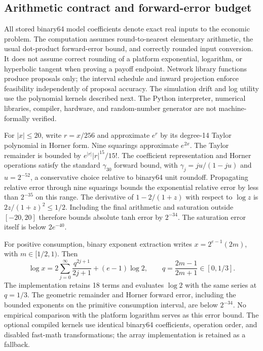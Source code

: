 \subsection{Arithmetic contract and forward-error budget}\label{app:r11arithmetic}
All stored binary64 model coefficients denote exact real inputs to the economic problem. The computation assumes round-to-nearest elementary arithmetic, the usual dot-product forward-error bound, and correctly rounded input conversion. It does not assume correct rounding of a platform exponential, logarithm, or hyperbolic tangent when proving a payoff endpoint. Network library functions produce proposals only; the interval schedule and inward projection enforce feasibility independently of proposal accuracy. The simulation drift and log utility use the polynomial kernels described next. The Python interpreter, numerical libraries, compiler, hardware, and random-number generator are not machine-formally verified.

For $|x|\leq20$, write $r=x/256$ and approximate $e^r$ by its degree-14 Taylor polynomial in Horner form. Nine squarings approximate $e^{2x}$. The Taylor remainder is bounded by
$e^{|r|}|r|^{15}/15!$. The coefficient representation and Horner operations satisfy the standard $\gamma_{30}$ forward bound, with $\gamma_j=ju/(1-ju)$ and $u=2^{-52}$, a conservative choice relative to binary64 unit roundoff. Propagating relative error through nine squarings bounds the exponential relative error by less than $2^{-35}$ on this range. The derivative of $1-2/(1+z)$ with respect to $\log z$ is $2z/(1+z)^2\leq1/2$. Including the final arithmetic and saturation outside $[-20,20]$ therefore bounds absolute tanh error by $2^{-34}$. The saturation error itself is below $2e^{-40}$.

For positive consumption, binary exponent extraction writes $x=2^{e-1}(2m)$, with $m\in[1/2,1)$. Then
\[
 \log x=2\sum_{j=0}^{\infty}\frac{q^{2j+1}}{2j+1}
                 +(e-1)\log2,\qquad q=\frac{2m-1}{2m+1}\in[0,1/3].
\]
The implementation retains 18 terms and evaluates $\log2$ with the same series at $q=1/3$. The geometric remainder and Horner forward error, including the bounded exponents on the primitive consumption interval, are below $2^{-34}$. No empirical comparison with the platform logarithm serves as this error bound. The optional compiled kernels use identical binary64 coefficients, operation order, and disabled fast-math transformations; the array implementation is retained as a fallback.

